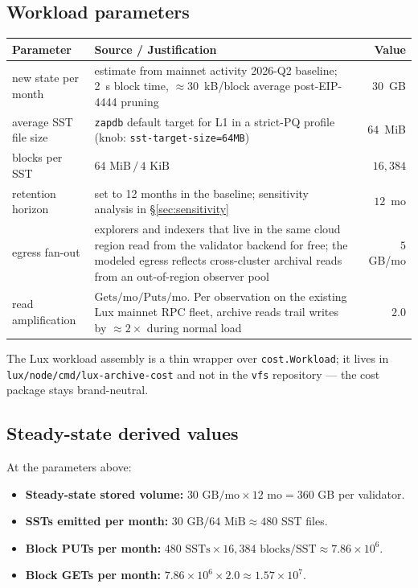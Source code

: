 \documentclass[11pt,a4paper]{article}
\begin{document}
\subsection{Workload parameters}

\begin{tabularx}{\linewidth}{lXr}
\toprule
\textbf{Parameter} & \textbf{Source / Justification} & \textbf{Value} \\
\midrule
new state per month & estimate from mainnet activity 2026-Q2 baseline; 2~s block
  time, $\approx 30$~kB/block average post-EIP-4444 pruning &
  $30$~GB \\
average SST file size & \texttt{zapdb} default target for L1 in a strict-PQ
  profile (knob: \verb|sst-target-size=64MB|) &
  $64$~MiB \\
blocks per SST & $64\text{ MiB}\,/\,4\text{ KiB}$ &
  $16{,}384$ \\
retention horizon & set to 12 months in the baseline; sensitivity
  analysis in §\ref{sec:sensitivity} &
  $12$~mo \\
egress fan-out & explorers and indexers that live in the same cloud region
  read from the validator backend for free; the modeled egress
  reflects cross-cluster archival reads from an out-of-region observer
  pool &
  $5$~GB/mo \\
read amplification & $\text{Gets/mo} / \text{Puts/mo}$. Per
  observation on the existing Lux mainnet RPC fleet, archive reads
  trail writes by $\approx 2 \times$ during normal load &
  $2.0$ \\
\bottomrule
\end{tabularx}

The Lux workload assembly is a thin wrapper over
\texttt{cost.Workload}; it lives in \texttt{lux/node/cmd/lux-archive-cost}
and not in the \texttt{vfs} repository --- the cost package stays
brand-neutral.

\subsection{Steady-state derived values}

At the parameters above:
\begin{itemize}[noitemsep]
  \item \textbf{Steady-state stored volume:} $30 \text{ GB/mo} \times 12 \text{ mo} = 360$ GB per validator.
  \item \textbf{SSTs emitted per month:} $30 \text{ GB} / 64 \text{ MiB} \approx 480$ SST files.
  \item \textbf{Block PUTs per month:} $480 \text{ SSTs} \times 16{,}384 \text{ blocks/SST} \approx 7.86 \times 10^6$.
  \item \textbf{Block GETs per month:} $7.86 \times 10^6 \times 2.0 \approx 1.57 \times 10^7$.
\end{itemize}
\end{document}
